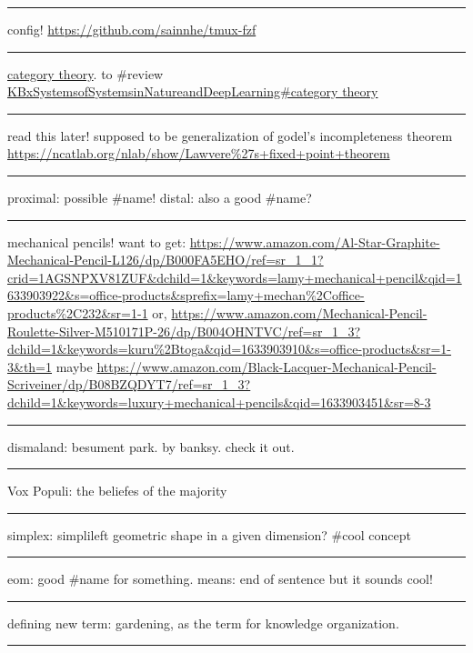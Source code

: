 \documentclass[letterpaper]{article}
\begin{document}
\noindent\rule{\textwidth}{0.5pt}

config! \url{https://github.com/sainnhe/tmux-fzf}

\noindent\rule{\textwidth}{0.5pt}

\href{https://ncatlab.org/nlab/show/category+theory}{category theory}. to
\#review \href{KBxSystemsofSystemsinNatureandDeepLearning\#category theory.org}{KBxSystemsofSystemsinNatureandDeepLearning\#category theory}

\noindent\rule{\textwidth}{0.5pt}

read this later! supposed to be generalization of godel's incompleteness
theorem \url{https://ncatlab.org/nlab/show/Lawvere\%27s+fixed+point+theorem}

\noindent\rule{\textwidth}{0.5pt}

proximal: possible \#name! distal: also a good \#name?

\noindent\rule{\textwidth}{0.5pt}

mechanical pencils! want to get:
\url{https://www.amazon.com/Al-Star-Graphite-Mechanical-Pencil-L126/dp/B000FA5EHO/ref=sr\_1\_1?crid=1AGSNPXV81ZUF\&dchild=1\&keywords=lamy+mechanical+pencil\&qid=1633903922\&s=office-products\&sprefix=lamy+mechan\%2Coffice-products\%2C232\&sr=1-1}
or,
\url{https://www.amazon.com/Mechanical-Pencil-Roulette-Silver-M510171P-26/dp/B004OHNTVC/ref=sr\_1\_3?dchild=1\&keywords=kuru\%2Btoga\&qid=1633903910\&s=office-products\&sr=1-3\&th=1}
maybe
\url{https://www.amazon.com/Black-Lacquer-Mechanical-Pencil-Scriveiner/dp/B08BZQDYT7/ref=sr\_1\_3?dchild=1\&keywords=luxury+mechanical+pencils\&qid=1633903451\&sr=8-3}

\noindent\rule{\textwidth}{0.5pt}

dismaland: besument park. by banksy. check it out.

\noindent\rule{\textwidth}{0.5pt}

Vox Populi: the beliefes of the majority

\noindent\rule{\textwidth}{0.5pt}

simplex: simplileft geometric shape in a given dimension? \#cool concept

\noindent\rule{\textwidth}{0.5pt}

eom: good \#name for something. means: end of sentence but it sounds
cool!

\noindent\rule{\textwidth}{0.5pt}

defining new term: gardening, as the term for knowledge organization.

\noindent\rule{\textwidth}{0.5pt}
\end{document}
